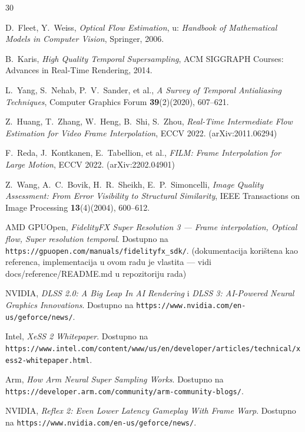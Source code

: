 \documentclass{mathos}
\begin{document}
\begin{thebibliography}{30}

{\sc D.~Fleet, Y.~Weiss}, {\em Optical Flow Estimation}, u: {\em Handbook of
Mathematical Models in Computer Vision}, Springer, 2006.

{\sc B.~Karis}, {\em High Quality Temporal Supersampling}, ACM SIGGRAPH
Courses: Advances in Real-Time Rendering, 2014.

{\sc L.~Yang}, {\sc S.~Nehab}, {\sc P.~V.~Sander}, et al., {\em A Survey of
Temporal Antialiasing Techniques}, Computer Graphics Forum
{\bf 39}(2)(2020), 607--621.

{\sc Z.~Huang}, {\sc T.~Zhang}, {\sc W.~Heng}, {\sc B.~Shi}, {\sc S.~Zhou},
{\em Real-Time Intermediate Flow Estimation for Video Frame Interpolation},
ECCV 2022. (arXiv:2011.06294)

{\sc F.~Reda}, {\sc J.~Kontkanen}, {\sc E.~Tabellion}, et al., {\em FILM:
Frame Interpolation for Large Motion}, ECCV 2022. (arXiv:2202.04901)

{\sc Z.~Wang}, {\sc A.~C.~Bovik}, {\sc H.~R.~Sheikh}, {\sc E.~P.~Simoncelli},
{\em Image Quality Assessment: From Error Visibility to Structural
Similarity}, IEEE Transactions on Image Processing {\bf 13}(4)(2004),
600--612.

AMD GPUOpen, {\em FidelityFX Super Resolution 3 — Frame interpolation,
Optical flow, Super resolution temporal}. Dostupno na
{\verb"https://gpuopen.com/manuals/fidelityfx_sdk/"}. (dokumentacija
korištena kao referenca, implementacija u ovom radu je vlastita — vidi
docs/reference/README.md u repozitoriju rada)

NVIDIA, {\em DLSS 2.0: A Big Leap In AI Rendering} i {\em DLSS 3: AI-Powered
Neural Graphics Innovations}. Dostupno na
{\verb"https://www.nvidia.com/en-us/geforce/news/"}.

Intel, {\em XeSS 2 Whitepaper}. Dostupno na
{\verb"https://www.intel.com/content/www/us/en/developer/articles/technical/xess2-whitepaper.html"}.

Arm, {\em How Arm Neural Super Sampling Works}. Dostupno na
{\verb"https://developer.arm.com/community/arm-community-blogs/"}.

NVIDIA, {\em Reflex 2: Even Lower Latency Gameplay With Frame Warp}.
Dostupno na {\verb"https://www.nvidia.com/en-us/geforce/news/"}.

\end{thebibliography}
\end{document}
